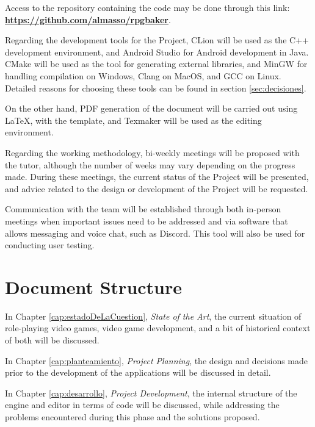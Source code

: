 \smallskip

Access to the repository containing the code may be done through this link: \href{https://github.com/almasso/rpgbaker}{\textbf{https://github.com/almasso/rpgbaker}}.

\medskip

Regarding the development tools for the Project, CLion will be used as the C++ development environment, and Android Studio for Android development in Java. CMake will be used as the tool for generating external libraries, and MinGW for handling compilation on Windows, Clang on MacOS, and GCC on Linux. Detailed reasons for choosing these tools can be found in section \ref{sec:decisiones}.

\medskip

On the other hand, PDF generation of the document will be carried out using \LaTeX, with the \texis template, and Texmaker will be used as the editing environment.

\bigskip

Regarding the working methodology, bi-weekly meetings will be proposed with the tutor, although the number of weeks may vary depending on the progress made. During these meetings, the current status of the Project will be presented, and advice related to the design or development of the Project will be requested.

\medskip

Communication with the team will be established through both in-person meetings when important issues need to be addressed and via software that allows messaging and voice chat, such as Discord. This tool will also be used for conducting user testing.

\section*{Document Structure} 
In Chapter \ref{cap:estadoDeLaCuestion}, \textit{State of the Art}, the current situation of role-playing video games, video game development, and a bit of historical context of both will be discussed.

\medskip

In Chapter \ref{cap:planteamiento}, \textit{Project Planning}, the design and decisions made prior to the development of the applications will be discussed in detail.

\medskip

In Chapter \ref{cap:desarrollo}, \textit{Project Development}, the internal structure of the engine and editor in terms of code will be discussed, while addressing the problems encountered during this phase and the solutions proposed.

